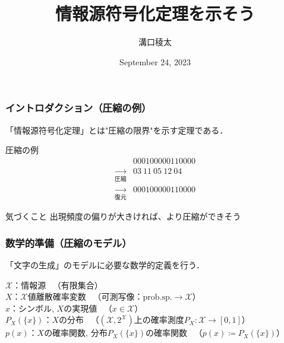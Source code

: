 \documentclass{classes/myslide}
\title{情報源符号化定理を示そう}
\author{溝口稜太}
\institute{創域理工学部情報計算科学科４年}
\date{September 24, 2023}
\begin{document}
\begin{frame}
  \titlepage
\end{frame}

\begin{frame}\frametitle{イントロダクション（圧縮の例）}

  「情報源符号化定理」とは"圧縮の限界"を示す定理である．

  \begin{exampleblock}{圧縮の例}
    \begin{align*}
      &000100000110000 \\
      \xrightarrow[圧縮]{} & 03 \ 11 \ 05 \ 12 \ 04 \\
      \xrightarrow[復元]{} & 000100000110000 
    \end{align*}
  \end{exampleblock}

  \begin{alertblock}{気づくこと}
    出現頻度の偏りが大きければ、より圧縮ができそう
  \end{alertblock}

\end{frame}

\begin{frame}\frametitle{数学的準備（圧縮のモデル）}
  「文字の生成」のモデルに必要な数学的定義を行う．
  \begin{definition}[情報源など]
    $\mathcal{X}$：情報源 \ （有限集合）\\
    $X$：$\mathcal{X}$値離散確率変数 \ （可測写像：$\mathrm{prob. sp.} \rightarrow \mathcal{X}$）\\
    $x$：シンボル, $X$の実現値 \ （$ x \in \mathcal{X}$） \\
    $P_X(\{x\})$：$X$の分布 \ （$(\mathcal{X}, 2^{\mathcal{X}})$上の確率測度$P_X: \mathcal{X} \rightarrow [0, 1]$） \\
    $p(x)$：$X$の確率関数, 分布$P_X(\{x\})$の確率関数 \ （$p(x) \coloneq P_X(\{x\})$）
  \end{definition}
\end{frame}
\end{document}
